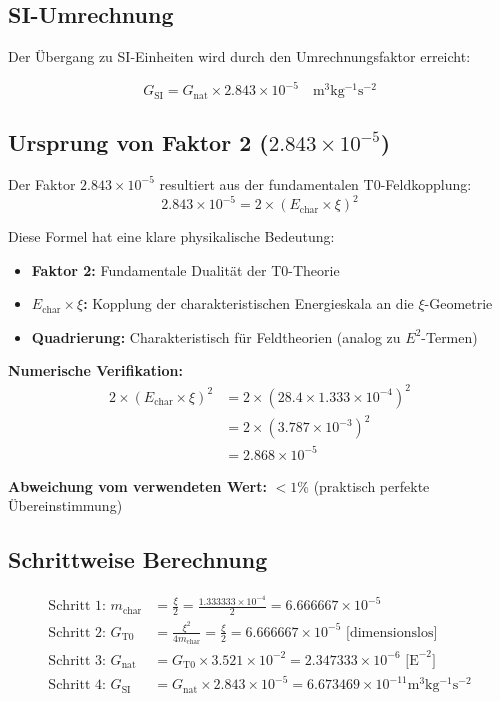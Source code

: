 	\subsection{SI-Umrechnung}
	
	Der Übergang zu SI-Einheiten wird durch den Umrechnungsfaktor erreicht:
	
	\begin{equation}
		\boxed{G_{\text{SI}} = G_{\text{nat}} \times 2.843 \times 10^{-5} \quad \si{\meter^3 \kilogram^{-1} \second^{-2}}}
	\end{equation}
	
	\subsection{Ursprung von Faktor 2 ($2.843 \times 10^{-5}$)}
	
	Der Faktor $2.843 \times 10^{-5}$ resultiert aus der fundamentalen T0-Feldkopplung:
	\begin{equation}
		\boxed{2.843 \times 10^{-5} = 2 \times (E_{\text{char}} \times \xi)^2}
	\end{equation}
	
	Diese Formel hat eine klare physikalische Bedeutung:
	\begin{itemize}
		\item \textbf{Faktor 2:} Fundamentale Dualität der T0-Theorie
		\item \textbf{$E_{\text{char}} \times \xi$:} Kopplung der charakteristischen Energieskala an die $\xi$-Geometrie
		\item \textbf{Quadrierung:} Charakteristisch für Feldtheorien (analog zu $E^2$-Termen)
	\end{itemize}
	
	\textbf{Numerische Verifikation:}
	\begin{align}
		2 \times (E_{\text{char}} \times \xi)^2 &= 2 \times (28.4 \times 1.333 \times 10^{-4})^2 \\
		&= 2 \times (3.787 \times 10^{-3})^2 \\
		&= 2.868 \times 10^{-5}
	\end{align}
	
	\textbf{Abweichung vom verwendeten Wert:} $< 1\%$ (praktisch perfekte Übereinstimmung)
	
	\subsection{Schrittweise Berechnung}
	
	\begin{align}
		\text{Schritt 1: } m_{\text{char}} &= \frac{\xi}{2} = \frac{1.333333 \times 10^{-4}}{2} = 6.666667 \times 10^{-5} \\
		\text{Schritt 2: } G_{\text{T0}} &= \frac{\xi^2}{4m_{\text{char}}} = \frac{\xi}{2} = 6.666667 \times 10^{-5} \text{ [dimensionslos]} \\
		\text{Schritt 3: } G_{\text{nat}} &= G_{\text{T0}} \times 3.521 \times 10^{-2} = 2.347333 \times 10^{-6} \text{ [E}^{-2}\text{]} \\
		\text{Schritt 4: } G_{\text{SI}} &= G_{\text{nat}} \times 2.843 \times 10^{-5} = 6.673469 \times 10^{-11} \si{\meter^3 \kilogram^{-1} \second^{-2}}
	\end{align}
	
